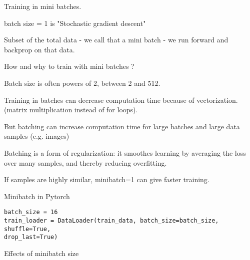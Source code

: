 \documentclass[30pt, a4]{article}
\begin{document}
Training in mini batches.

batch size = 1 is "Stochastic gradient descent"

Subset of the total data - we call that a mini batch - we run forward and
backprop on that data.

How and why to train with mini batches ?

Batch size is often powers of 2, between 2 and 512.

Training in batches can decrease computation time because of vectorization.
(matrix multiplication instead of for loops).

But batching can increase computation time for large batches and large data
samples (e.g. images)

Batching is a form of regularization: it smoothes learning by averaging the loss
over many samples, and thereby reducing overfitting.

If samples are highly similar, minibatch=1 can give faster training.

Minibatch in Pytorch

\begin{lstlisting}
batch_size = 16
train_loader = DataLoader(train_data, batch_size=batch_size, shuffle=True,
drop_last=True)
\end{lstlisting}

Effects of minibatch size
\end{document}
